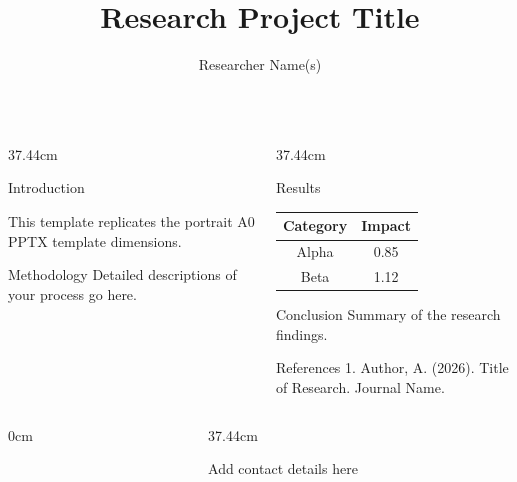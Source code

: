 \documentclass[final]{beamer}
\title{Research Project Title}
\author{Researcher Name(s)}
\institute{Department of (insert department),\\ University College London}
\begin{document}
\begin{frame}[t]
\begin{minipage}[t][88.75cm][t]{1.0\textwidth}

\begin{columns}[t]

\begin{column}{37.44cm}
  \begin{block}{Introduction}
  
    This template replicates the portrait A0 PPTX template dimensions. 
  \end{block}

  \begin{block}{Methodology}
    Detailed descriptions of your process go here. 
  \end{block}
\end{column}
\begin{column}{37.44cm}
  \begin{block}{Results}
    \centering
    \begin{tabular}{cc}
        \toprule
        \textbf{Category} & \textbf{Impact} \\
        \midrule
        Alpha & 0.85 \\
        Beta & 1.12 \\
        \bottomrule
    \end{tabular}
  \end{block}

  \begin{block}{Conclusion}
    Summary of the research findings.
  \end{block}
  
  \begin{block}{References}
    \footnotesize
    1. Author, A. (2026). Title of Research. Journal Name.
  \end{block}
\end{column}

\end{columns}

\end{minipage}

\begin{columns}[b]
\begin{column}{0cm} %
\end{column}
\begin{column}{37.44cm}

        \begin{minipage}[t][5cm][t]{1.0\textwidth}
             Add contact details here
        \end{minipage}%


\end{column}
\end{columns}
\end{frame}
\end{document}
